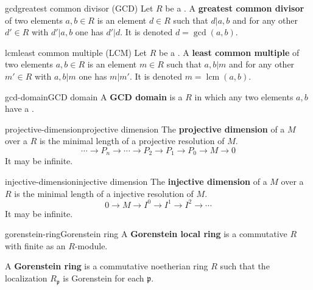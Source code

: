 \begin{topic}{gcd}{greatest common divisor (GCD)}
    Let $R$ be a . A \textbf{greatest common divisor} of two elements $a, b \in R$ is an element $d \in R$ such that $d | a, b$ and for any other $d' \in R$ with $d' | a, b$ one has $d' | d$. It is denoted $d = \operatorname{gcd}(a, b)$.
\end{topic}

\begin{topic}{lcm}{least common multiple (LCM)}
    Let $R$ be a . A \textbf{least common multiple} of two elements $a, b \in R$ is an element $m \in R$ such that $a, b | m$ and for any other $m' \in R$ with $a, b | m$ one has $m | m'$. It is denoted $m = \operatorname{lcm}(a, b)$.
\end{topic}

\begin{topic}{gcd-domain}{GCD domain}
    A \textbf{GCD domain} is a  $R$ in which any two elements $a, b$ have a .
\end{topic}

\begin{topic}{projective-dimension}{projective dimension}
    The \textbf{projective dimension} of a  $M$ over a  $R$ is the minimal length of a projective resolution of $M$.
    \[ \cdots \to P_n \to \cdots \to P_2 \to P_1 \to P_0 \to M \to 0 \]
    It may be infinite.
\end{topic}


\begin{topic}{injective-dimension}{injective dimension}
    The \textbf{injective dimension} of a  $M$ over a  $R$ is the minimal length of a injective resolution of $M$.
    \[ 0 \to M \to I^0 \to I^1 \to I^2 \to \cdots \]
    It may be infinite.
\end{topic}

\begin{topic}{gorenstein-ring}{Gorenstein ring}
    A \textbf{Gorenstein local ring} is a commutative    $R$ with finite  as an $R$-module.
    
    A \textbf{Gorenstein ring} is a commutative noetherian ring $R$ such that the localization $R_\mathfrak{p}$ is Gorenstein for each  $\mathfrak{p}$.
\end{topic}

